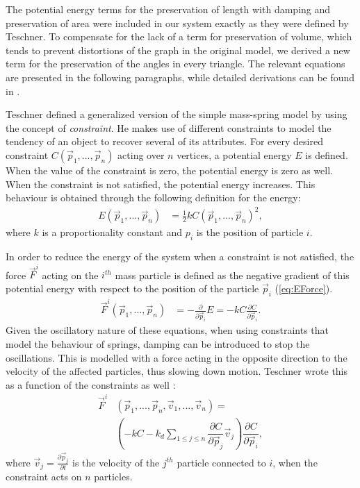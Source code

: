 \documentclass[journal]{IEEEtran}
\newcommand{\eref}[1]{(\ref{#1})}
\begin{document}
The potential energy terms for the preservation of length with damping and preservation of area were included in our system exactly as they were defined by Teschner.  To compensate for the lack of a term for preservation of volume, which tends to prevent distortions of the graph in the original model, we derived a new term for the preservation of the angles in every triangle.  The relevant equations are presented in the following paragraphs, while detailed derivations can be found in \cite{Arriola2013thesis}.

Teschner defined a generalized version of the simple mass-spring model by using the concept of \emph{constraint}.  He makes use of different constraints to model the tendency of an object to recover several of its attributes. For every desired constraint $C(\vec{p}_1,...,\vec{p}_{n})$ acting over $n$ vertices, a potential energy $E$ is defined.  When the value of the constraint is zero, the potential energy is zero as well.  When the constraint is not satisfied, the potential energy increases.  This behaviour is obtained through the following definition for the energy:
\begin{align}
 E(\vec{p}_1,...,\vec{p}_{n}) & = \frac{1}{2}kC(\vec{p}_1,...,\vec{p}_{n})^2, \label{eq:EConstraint}
\end{align}
where $k$ is a proportionality constant and $p_i$ is the position of particle $i$.

In order to reduce the energy of the system when a constraint is not satisfied, the force $\vec{F}^i$ acting on the $i^{th}$ mass particle is defined as the negative gradient of this potential energy with respect to the position of the particle $\vec{p}_i$ \eref{eq:EForce}.
\begin{align}
 \vec{F}^i(\vec{p}_1,...,\vec{p}_{n}) & = -\frac{\partial}{\partial \vec{p}_i}E = -kC\frac{\partial C}{\partial \vec{p}_i}. \label{eq:EForce}
\end{align}
Given the oscillatory nature of these equations, when using constraints that model the behaviour of springs, damping can be introduced to stop the oscillations.  This is modelled with a force acting in the opposite direction to the velocity of the affected particles, thus slowing down motion.  Teschner wrote this as a function of the constraints as well \cite{Teschner2004}:
\begin{align}
 \label{eq:Fdamping}
 \vec{F}^i&(\vec{p}_1,...,\vec{p}_{n},\vec{v}_1,...,\vec{v}_{n}) = \nonumber \\
    &\left( -kC-k_d\sum_{1 \le j \le n} \dfrac{\partial C}{\partial \vec{p}_j}\vec{v}_j \right)
 \dfrac{\partial C}{\partial \vec{p}_i},
\end{align}
where $\vec{v}_j = \frac{\partial \vec{p}_j}{\partial t}$ is the velocity of the $j^{th}$ particle connected to $i$, when the constraint acts on $n$ particles.
\end{document}
